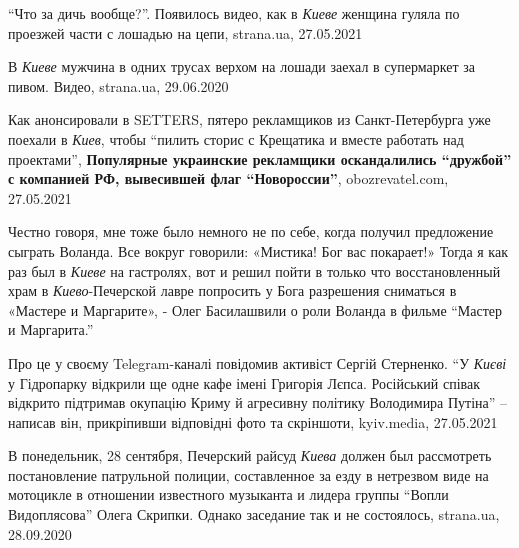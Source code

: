 \enquote{Что за дичь вообще?}. Появилось видео, как в \emph{Киеве} женщина
гуляла по проезжей части с лошадью на цепи, strana.ua, 27.05.2021

В \emph{Киеве} мужчина в одних трусах верхом на лошади заехал в супермаркет за пивом.
Видео, strana.ua, 29.06.2020

Как анонсировали в SETTERS, пятеро рекламщиков из Санкт-Петербурга уже поехали
в \emph{Киев}, чтобы \enquote{пилить сторис с Крещатика и вместе работать над
проектами}, \textbf{Популярные украинские рекламщики оскандалились
\enquote{дружбой} с компанией РФ, вывесившей флаг \enquote{Новороссии}},
obozrevatel.com, 27.05.2021

Честно говоря, мне тоже было немного не по себе, когда получил предложение
сыграть Воланда. Все вокруг говорили: «Мистика! Бог вас покарает!» Тогда я как
раз был в \emph{Киеве} на гастролях, вот и решил пойти в только что восстановленный
храм в \emph{Киево}-Печерской лавре попросить у Бога разрешения сниматься в «Мастере и
Маргарите», - Олег Басилашвили о роли Воланда в фильме  \enquote{Мастер и Маргарита.}

Про це у своєму Telegram-каналі повідомив активіст Сергій Стерненко.
\enquote{У \emph{Києві} у Гідропарку відкрили ще одне кафе імені Григорія
Лєпса.  Російський співак відкрито підтримав окупацію Криму й агресивну
політику Володимира Путіна} – написав він, прикріпивши відповідні фото та
скріншоти, kyiv.media, 27.05.2021

В понедельник, 28 сентября, Печерский райсуд \emph{Киева} должен был
рассмотреть постановление патрульной полиции, составленное за езду в нетрезвом
виде на мотоцикле в отношении известного музыканта и лидера группы
\enquote{Вопли Видоплясова} Олега Скрипки. Однако заседание так и не
состоялось, strana.ua, 28.09.2020
